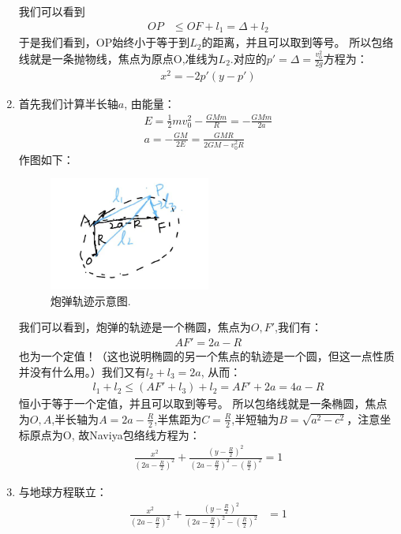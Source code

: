 \begin{enumerate}
		我们可以看到
	\begin{align*}
		OP &\leq OF + l_1=\Delta +l_2 
	\end{align*}
	于是我们看到，OP始终小于等于到\(L_2\)的距离，并且可以取到等号。
		所以包络线就是一条抛物线，焦点为原点O,准线为\(L_2\).对应的\(p'=\Delta=\frac{v_0^2}{2g}\)方程为：
	\begin{align*}
		x^2=-2p'(y-p')  
	\end{align*}
	\item 首先我们计算半长轴\(a\),
	由能量：
	\begin{align*}
		E = \frac{1}{2}mv_0^2 - \frac{GMm}{R} = -\frac{GMm}{2a} \\
		a = -\frac{GM}{2E} = \frac{GMR}{2GM - v_0^2R}
	\end{align*}
	作图如下：
	\begin{figure}[htbp]
	\centering
	\includegraphics[width=0.5\textwidth]{fire2a}
	\caption{炮弹轨迹示意图.}
	\label{fire2a}
	\end{figure}
		我们可以看到，炮弹的轨迹是一个椭圆，焦点为\(O,F'\),我们有：
	\begin{align*}
		AF' = 2a - R
	\end{align*}
	也为一个定值！（这也说明椭圆的另一个焦点的轨迹是一个圆，但这一点性质并没有什么用。）我们又有\(l_2+l_3=2a\),
	从而：
	\begin{align*}
		l_1+l_2\leq  (AF' + l_3) + l_2 = AF' + 2a = 4a - R
	\end{align*}
	恒小于等于一个定值，并且可以取到等号。
		所以包络线就是一条椭圆，焦点为\(O,A\),半长轴为\(A=2a-\frac{R}{2}\),半焦距为\(C=\frac{R}{2}\),半短轴为\(B=\sqrt{a^2-c^2}\)，注意坐标原点为O, 故Naviya包络线方程为：
	\begin{align*}
		\frac{x^2}{(2a-\frac{R}{2})^2} + \frac{(y-\frac{R}{2})^2}{(2a-\frac{R}{2})^2-(\frac{R}{2})^2} = 1
	\end{align*}
	\item 与地球方程联立：
	\begin{align*}
		\frac{x^2}{(2a-\frac{R}{2})^2} + \frac{(y-\frac{R}{2})^2}{(2a-\frac{R}{2})^2-(\frac{R}{2})^2}  &= 1 \\

\end{align*}
\end{enumerate}
